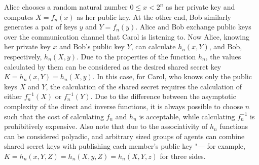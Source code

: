 Alice chooses a random natural number $0 \le x < 2^n$ as her private key and computes $X = f_n(x)$ as her public key. At the other end, Bob similarly generates a pair of keys $y$ and $Y = f_n(y)$. Alice and Bob exchange public keys over the communication channel that Carol is listening to. Now Alice, knowing her private key $x$ and Bob's public key $Y$, can calculate $h_n(x, Y)$, and Bob, respectively, $h_n(X, y)$. Due to the properties of the function $h_n$, the values ​​calculated by them can be considered as the desired shared secret key $K = h_n(x, Y) = h_n(X, y)$. In this case, for Carol, who knows only the public keys $X$ and $Y$, the calculation of the shared secret requires the calculation of either $f_n^{-1}(X)$ or $f_n^{-1}(Y)$. Due to the difference between the asymptotic complexity of the direct and inverse functions, it is always possible to choose $n$ such that the cost of calculating $f_n$ and $h_n$ is acceptable, while calculating $f_n^{-1}$ is prohibitively expensive. Also note that due to the associativity of $h_n$ functions can be considered polyadic, and arbitrary sized groups of agents can combine shared secret keys with publishing each member's public key "--- for example, $K = h_n(x, Y, Z ) = h_n(X, y, Z) = h_n(X, Y, z)$ for three sides. %

